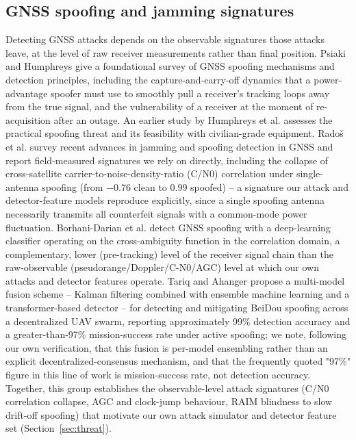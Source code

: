 \documentclass[journal]{IEEEtran}
\begin{document}
\subsection{GNSS spoofing and jamming signatures}
Detecting GNSS attacks depends on the observable signatures those attacks leave, at the level of raw
receiver measurements rather than final position. Psiaki and Humphreys \cite{psiaki2016gnss} give a
foundational survey of GNSS spoofing mechanisms and detection principles, including the
capture-and-carry-off dynamics that a power-advantage spoofer must use to smoothly pull a receiver's
tracking loops away from the true signal, and the vulnerability of a receiver at the moment of
re-acquisition after an outage. An earlier study by Humphreys et al.
\cite{humphreys2008assessing} assesses the practical spoofing threat and its feasibility with
civilian-grade equipment. Radoš et al. \cite{rados2024recent} survey recent advances in jamming and
spoofing detection in GNSS and report field-measured signatures we rely on directly, including the
collapse of cross-satellite carrier-to-noise-density-ratio (C/N0) correlation under single-antenna
spoofing (from $-0.76$ clean to $0.99$ spoofed) -- a signature our attack and detector-feature models
reproduce explicitly, since a single spoofing antenna necessarily transmits all counterfeit signals with
a common-mode power fluctuation. Borhani-Darian et al. \cite{borhanidarian2024detecting} detect GNSS
spoofing with a deep-learning classifier operating on the cross-ambiguity function in the correlation
domain, a complementary, lower (pre-tracking) level of the receiver signal chain than the
raw-observable (pseudorange/Doppler/C-N0/AGC) level at which our own attacks and detector features
operate. Tariq and Ahanger \cite{tariq2026multimodel} propose a multi-model fusion scheme -- Kalman
filtering combined with ensemble machine learning and a transformer-based detector -- for detecting and
mitigating BeiDou spoofing across a decentralized UAV swarm, reporting approximately 99\% detection
accuracy and a greater-than-97\% mission-success rate under active spoofing; we note, following our own
verification, that this fusion is per-model ensembling rather than an explicit decentralized-consensus
mechanism, and that the frequently quoted "97\%" figure in this line of work is mission-success rate,
not detection accuracy. Together, this group establishes the observable-level attack signatures
(C/N0 correlation collapse, AGC and clock-jump behaviour, RAIM blindness to slow drift-off spoofing) that
motivate our own attack simulator and detector feature set (Section~\ref{sec:threat}).
\end{document}
